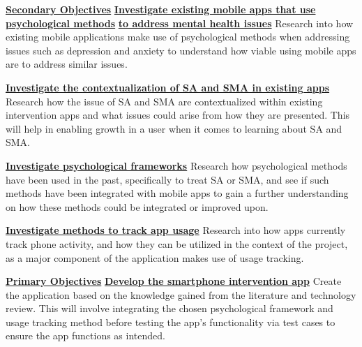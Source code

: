 \documentclass[12pt]{article}
\begin{document}
\noindent\underline{\textbf{Secondary Objectives}}\newline\newline
\noindent\underline{\textbf{Investigate existing mobile apps that use psychological methods}}\newline
\noindent\underline{\textbf{to address mental health issues}}\newline
Research into how existing mobile applications make use of psychological methods when addressing issues such as 
depression and anxiety to understand how viable using mobile apps are to address similar issues.\newline

\noindent\underline{\textbf{Investigate the contextualization of SA and SMA in existing apps}}\newline
Research how the issue of SA and SMA are contextualized within existing intervention apps and what issues could
arise from how they are presented. This will help in enabling growth in a user when it comes to learning about
SA and SMA.\newline

\noindent\underline{\textbf{Investigate psychological frameworks}}\newline
Research how psychological methods have been used in the past, specifically to treat SA or SMA, and see if such 
methods have been integrated with mobile apps to gain a further understanding on how these methods could be 
integrated or improved upon.\newline

\noindent\underline{\textbf{Investigate methods to track app usage}}\newline
Research into how apps currently track phone activity, and how they can be utilized in the context of the project,
as a major component of the application makes use of usage tracking.\newline

\noindent\underline{\textbf{Primary Objectives}}\newline\newline
\noindent\underline{\textbf{Develop the smartphone intervention app}}\newline
Create the application based on the knowledge gained from the literature and technology review. This will involve
integrating the chosen psychological framework and usage tracking method before testing the app's functionality
via test cases to ensure the app functions as intended.  \newline
\end{document}

